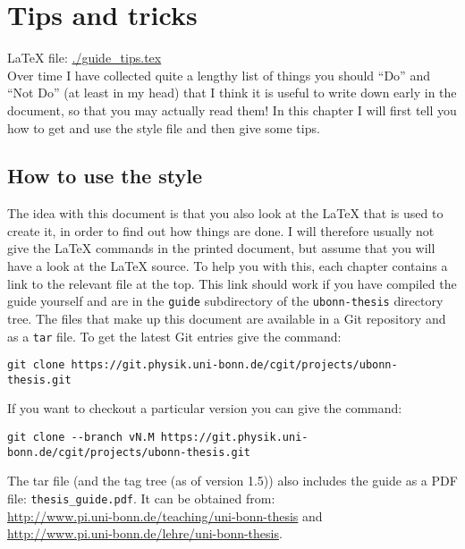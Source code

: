 \chapter{Tips and tricks}
\label{sec:tips}

\LaTeX{} file: \url{./guide_tips.tex}\\[1ex]
\noindent
Over time I have collected quite a lengthy list of things you should
\enquote{Do} and \enquote{Not Do} (at least in my head) that I think
it is useful to write down early in the document, so that you may
actually read them!  In this chapter I will first tell you how to get
and use the style file and then give some tips.

\section{How to use the  style}
\label{sec:tips:howto}

The idea with this document is that you also look at the \LaTeX{} that
is used to create it, in order to find out how things are done.  I
will therefore usually not give the \LaTeX{} commands in the printed
document, but assume that you will have a look at the \LaTeX{} source.
To help you with this, each chapter contains a link to the relevant
file at the top. This link should work if you have compiled the guide
yourself and are in the \texttt{guide} subdirectory of the
\texttt{ubonn-thesis} directory tree.  The files that make up this
document are available in a Git repository and as a
\texttt{tar} file. To get the latest Git entries give the
command:

{\small\begin{verbatim}
git clone https://git.physik.uni-bonn.de/cgit/projects/ubonn-thesis.git
\end{verbatim}}
\noindent
If you want to checkout a particular version you can give the command:
{\small\begin{verbatim}
git clone --branch vN.M https://git.physik.uni-bonn.de/cgit/projects/ubonn-thesis.git
\end{verbatim}}
\noindent
The tar file (and the tag tree (as of version 1.5)) also includes
the guide as a PDF file: \texttt{thesis\_guide.pdf}.  It can be
obtained from:\\
\url{http://www.pi.uni-bonn.de/teaching/uni-bonn-thesis}
and\\
\url{http://www.pi.uni-bonn.de/lehre/uni-bonn-thesis}.

